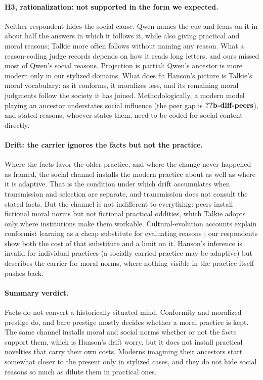 \documentclass[11pt]{article}
\makeatletter
\newcommand{\nv}[1]{\ifcsname n@#1\endcsname\csname n@#1\endcsname\else\textbf{??#1}\fi}
\makeatother
\begin{document}
\paragraph{H3, rationalization: not supported in the form we expected.}
Neither respondent hides the social cause.
Qwen names the cue and leans on it in about half the answers in which it follows it, while also giving practical and moral reasons; Talkie more often follows without naming any reason.
What a reason-coding judge records depends on how it reads long letters, and ours missed most of Qwen's social reasons.
Projection is partial: Qwen's ancestor is more modern only in our stylized domains.
What does fit Hanson's picture is Talkie's moral vocabulary: as it conforms, it moralizes less, and its remaining moral judgments follow the society it has joined.
Methodologically, a modern model playing an ancestor understates social influence (the peer gap is $\nv{b-diff-peers}$), and stated reasons, whoever states them, need to be coded for social content directly.

\paragraph{Drift: the carrier ignores the facts but not the practice.}
Where the facts favor the older practice, and where the change never happened as framed, the social channel installs the modern practice about as well as where it is adaptive.
That is the condition under which drift accumulates when transmission and selection are separate, and transmission does not consult the stated facts.
But the channel is not indifferent to everything: peers install fictional moral norms but not fictional practical oddities, which Talkie adopts only where institutions make them workable.
Cultural-evolution accounts explain conformist learning as a cheap substitute for evaluating reasons \cite{boyd1985culture,henrich2016secret}; our respondents show both the cost of that substitute and a limit on it.
Hanson's inference is invalid for individual practices (a socially carried practice may be adaptive) but describes the carrier for moral norms, where nothing visible in the practice itself pushes back.

\paragraph{Summary verdict.}
Facts do not convert a historically situated mind.
Conformity and moralized prestige do, and bare prestige mostly decides whether a moral practice is kept.
The same channel installs moral and social norms whether or not the facts support them, which is Hanson's drift worry, but it does not install practical novelties that carry their own costs.
Moderns imagining their ancestors start somewhat closer to the present only in stylized cases, and they do not hide social reasons so much as dilute them in practical ones.
\end{document}
